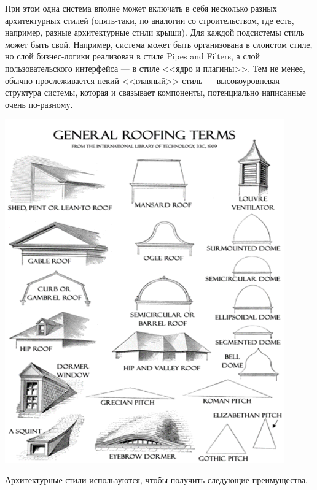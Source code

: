 \documentclass{../../text-style}
\begin{document}
\noindent\begin{minipage}{\textwidth}
    \begin{minipage}[c][6cm][c]{\dimexpr0.6\textwidth-0.5\Colsep\relax}
        При этом одна система вполне может включать в себя несколько разных архитектурных стилей (опять-таки, по аналогии со строительством, где есть, например, разные архитектурные стили крыши). Для каждой подсистемы стиль может быть свой. Например, система может быть организована в слоистом стиле, но слой бизнес-логики реализован в стиле Pipes and Filters, а слой пользовательского интерфейса --- в стиле <<ядро и плагины>>. Тем не менее, обычно прослеживается некий <<главный>> стиль --- высокоуровневая структура системы, которая и связывает компоненты, потенциально написанные очень по-разному.
    \end{minipage}\hfill
    \begin{minipage}[c][6cm][c]{\dimexpr0.4\textwidth-0.5\Colsep\relax}
        \includegraphics[width=0.9\textwidth]{roofStyles.png}
    \end{minipage}%
\end{minipage}

Архитектурные стили используются, чтобы получить следующие преимущества.
\end{document}
